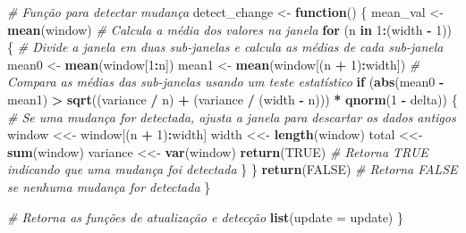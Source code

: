 \documentclass[
]{article}
\newenvironment{Shaded}{\begin{snugshade}}{\end{snugshade}}
\newcommand{\AttributeTok}[1]{\textcolor[rgb]{0.13,0.29,0.53}{#1}}
\newcommand{\CommentTok}[1]{\textcolor[rgb]{0.56,0.35,0.01}{\textit{#1}}}
\newcommand{\ConstantTok}[1]{\textcolor[rgb]{0.56,0.35,0.01}{#1}}
\newcommand{\ControlFlowTok}[1]{\textcolor[rgb]{0.13,0.29,0.53}{\textbf{#1}}}
\newcommand{\DecValTok}[1]{\textcolor[rgb]{0.00,0.00,0.81}{#1}}
\newcommand{\FunctionTok}[1]{\textcolor[rgb]{0.13,0.29,0.53}{\textbf{#1}}}
\newcommand{\NormalTok}[1]{#1}
\newcommand{\OtherTok}[1]{\textcolor[rgb]{0.56,0.35,0.01}{#1}}
\newcommand{\SpecialCharTok}[1]{\textcolor[rgb]{0.81,0.36,0.00}{\textbf{#1}}}
\begin{document}
\begin{Shaded}
\begin{Highlighting}[]
  \CommentTok{\# Função para detectar mudança}
\NormalTok{  detect\_change }\OtherTok{\textless{}{-}} \ControlFlowTok{function}\NormalTok{() \{}
\NormalTok{    mean\_val }\OtherTok{\textless{}{-}} \FunctionTok{mean}\NormalTok{(window) }\CommentTok{\# Calcula a média dos valores na janela}
    \ControlFlowTok{for}\NormalTok{ (n }\ControlFlowTok{in} \DecValTok{1}\SpecialCharTok{:}\NormalTok{(width }\SpecialCharTok{{-}} \DecValTok{1}\NormalTok{)) \{}
      \CommentTok{\# Divide a janela em duas sub{-}janelas e calcula as médias de cada sub{-}janela}
\NormalTok{      mean0 }\OtherTok{\textless{}{-}} \FunctionTok{mean}\NormalTok{(window[}\DecValTok{1}\SpecialCharTok{:}\NormalTok{n])}
\NormalTok{      mean1 }\OtherTok{\textless{}{-}} \FunctionTok{mean}\NormalTok{(window[(n }\SpecialCharTok{+} \DecValTok{1}\NormalTok{)}\SpecialCharTok{:}\NormalTok{width])}
      \CommentTok{\# Compara as médias das sub{-}janelas usando um teste estatístico}
      \ControlFlowTok{if}\NormalTok{ (}\FunctionTok{abs}\NormalTok{(mean0 }\SpecialCharTok{{-}}\NormalTok{ mean1) }\SpecialCharTok{\textgreater{}} \FunctionTok{sqrt}\NormalTok{((variance }\SpecialCharTok{/}\NormalTok{ n) }\SpecialCharTok{+}\NormalTok{ (variance }\SpecialCharTok{/}\NormalTok{ (width }\SpecialCharTok{{-}}\NormalTok{ n))) }\SpecialCharTok{*} \FunctionTok{qnorm}\NormalTok{(}\DecValTok{1} \SpecialCharTok{{-}}\NormalTok{ delta)) \{}
        \CommentTok{\# Se uma mudança for detectada, ajusta a janela para descartar os dados antigos}
\NormalTok{        window }\OtherTok{\textless{}\textless{}{-}}\NormalTok{ window[(n }\SpecialCharTok{+} \DecValTok{1}\NormalTok{)}\SpecialCharTok{:}\NormalTok{width]}
\NormalTok{        width }\OtherTok{\textless{}\textless{}{-}} \FunctionTok{length}\NormalTok{(window)}
\NormalTok{        total }\OtherTok{\textless{}\textless{}{-}} \FunctionTok{sum}\NormalTok{(window)}
\NormalTok{        variance }\OtherTok{\textless{}\textless{}{-}} \FunctionTok{var}\NormalTok{(window)}
        \FunctionTok{return}\NormalTok{(}\ConstantTok{TRUE}\NormalTok{) }\CommentTok{\# Retorna TRUE indicando que uma mudança foi detectada}
\NormalTok{      \}}
\NormalTok{    \}}
    \FunctionTok{return}\NormalTok{(}\ConstantTok{FALSE}\NormalTok{) }\CommentTok{\# Retorna FALSE se nenhuma mudança for detectada}
\NormalTok{  \}}
  
  \CommentTok{\# Retorna as funções de atualização e detecção}
  \FunctionTok{list}\NormalTok{(}\AttributeTok{update =}\NormalTok{ update)}
\NormalTok{\}}


\end{Highlighting}
\end{Shaded}
\end{document}
